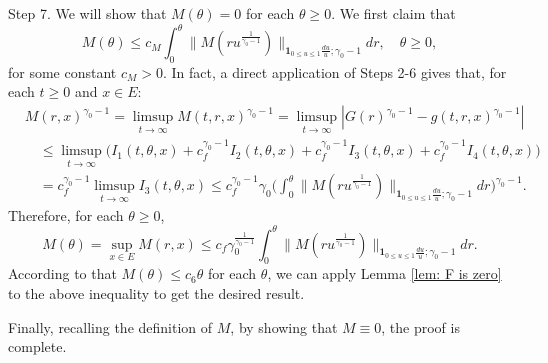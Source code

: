 \documentclass[12pt, a4paper]{amsart}
\theoremstyle{definition}
\numberwithin{equation}{section}
\begin{document}
	Step 7. We will show that $M(\theta) = 0$ for each $\theta \geq 0$.
	We first claim that
\[
	M(\theta)
	\leq c_M\int_0^\theta  \big\| M(r u^{\frac{1}{\gamma_0 - 1}}) \big\|_{\mathbf 1_{0\leq u\leq 1}\frac{du}{u};\gamma_0 - 1}  dr ,
	\quad \theta \geq 0,
\]
	for some constant $c_M > 0$.
	In fact, a direct application of Steps 2-6 gives that, for each $t\geq 0$ and $x\in E$:
\[\begin{split}
	&M(r,x)^{\gamma_0 - 1}
	=\limsup_{t\to \infty} M(t,r,x)^{\gamma_0 - 1}
	= \limsup_{t\to \infty}|G(r)^{\gamma_0 - 1} - g(t,r,x)^{\gamma_0 - 1}|
	\\&\quad \leq \limsup_{t\to \infty} \big( I_1(t,\theta,x) +c^{\gamma_0 - 1}_f I_2(t,\theta,x) +c^{\gamma_0 - 1}_f I_3(t,\theta,x) + c^{\gamma_0 - 1}_f I_4(t,\theta,x) \big)
	\\& \quad = c_f^{\gamma_0 - 1} \limsup_{t\to \infty} I_3(t,\theta ,x)
	\leq c_f^{\gamma_0 - 1} \gamma_0 \Big(  \int_0^\theta  \big\| M(r u^{\frac{1}{\gamma_0 - 1}}) \big\|_{\mathbf 1_{0\leq u\leq 1}\frac{du}{u};\gamma_0 - 1}  dr\Big)^{\gamma_0 - 1}.
\end{split}\]
	Therefore, for each $\theta \geq 0$,
\[
	M(\theta)
	= \sup_{x\in E}  M(r,x)
	\leq c_f \gamma_0^{\frac{1}{\gamma_0 - 1}} \int_0^\theta  \big\| M(r u^{\frac{1}{\gamma_0 - 1}}) \big\|_{\mathbf 1_{0\leq u\leq 1}\frac{du}{u};\gamma_0 - 1}  dr.
\]
		According to that $M(\theta) \leq c_6 \theta$ for each $\theta$, we can apply Lemma \ref{lem: F is zero} to the above inequality to get the desired result.
	
	Finally, recalling the definition of $M$, by showing that $M\equiv 0$, the proof is complete.
\end{document}
